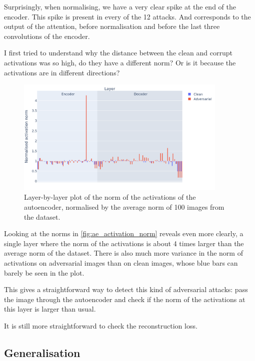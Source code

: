 \documentclass[]{scrarticle}
\begin{document}
Surprisingly, when normalising, we have a very clear spike at the end of the encoder.
This spike is present in every of the 12 attacks.
And corresponds to the output of the attention, before normalisation
and before the last three convolutions of the encoder.

I first tried to understand why the distance between the clean
and corrupt activations was so high, do they have a different norm?
Or is it because the activations are in different directions?

\begin{figure}[h]
  \centering
  \includegraphics[width=0.9\textwidth]{../images/ae_activation_norm.png}
  \caption{
    Layer-by-layer plot of the norm of the activations of the autoencoder,
    normalised by the average norm of 100 images from the dataset.
  }
  \label{fig:ae_activation_norm}
\end{figure}

Looking at the norms in \autoref{fig:ae_activation_norm} reveals
even more clearly, a single layer where the norm of the activations is about
4 times larger than the average norm of the dataset.
There is also much more variance in the norm of activations
on adversarial images than on clean images, whose blue
bars can barely be seen in the plot.

This gives a straightforward way to detect this kind of adversarial
attacks: pass the image through the autoencoder and check if the
norm of the activations at this layer is larger than usual.


\begin{remark}
  It is still more straightforward to check the reconstruction loss.
\end{remark}

\subsection{Generalisation}
\end{document}
